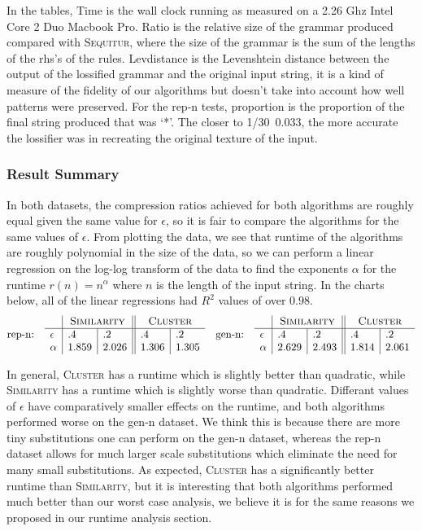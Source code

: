 \documentclass[11pt]{article}
\newcommand{\Sequitur}{\textsc{Sequitur}\xspace}
\newcommand{\Similarity}{\textsc{Similarity}\xspace}
\newcommand{\Cluster}{\textsc{Cluster}\xspace}
\begin{document}
In the tables, Time is the wall clock running as measured on a 2.26 Ghz Intel
Core 2 Duo Macbook Pro.  Ratio is the relative size of the grammar produced
compared with \Sequitur, where the size of the grammar is the sum of the
lengths of the rhs's of the rules. Levdistance is the Levenshtein distance
between the output of the lossified grammar and the original input string, it
is a kind of measure of the fidelity of our algorithms but doesn't take into
account how well patterns were preserved. For the rep-n tests, proportion is
the proportion of the final string produced that was `*'. The closer to
1/30~0.033, the more accurate the lossifier was in recreating the original
texture of the input.

\subsubsection{Result Summary}

In both datasets, the compression ratios achieved for both algorithms are
roughly equal given the same value for $\epsilon$, so it is fair to compare the
algorithms for the same values of $\epsilon$.  From plotting the data, we see
that runtime of the algorithms are roughly polynomial in the size of the data,
so we can perform a linear regression on the log-log transform of the data to
find the exponents $\alpha$ for the runtime $r(n)=n^\alpha$ where $n$ is the
length of the input string. In the charts below, all of the linear regressions
had $R^2$ values of over $0.98$.
\begin{align*}
  \text{rep-n:}\quad
  \begin{array}{l|l|l||l|l}
    & \multicolumn{2}{c||}{\Similarity} & \multicolumn{2}{c}{\Cluster} \\ \hline
    \epsilon & .4 & .2 & .4 & .2 \\
    \alpha   & 1.859 & 2.026 & 1.306 & 1.305
  \end{array}
  &&
  \text{gen-n:}\quad
  \begin{array}{l|l|l||l|l}
    & \multicolumn{2}{c||}{\Similarity} & \multicolumn{2}{c}{\Cluster} \\ \hline
    \epsilon & .4 & .2 & .4 & .2 \\
    \alpha   & 2.629 & 2.493 & 1.814 & 2.061
  \end{array}
\end{align*}

In general, \Cluster has a runtime which is slightly better than quadratic,
while \Similarity has a runtime which is slightly worse than quadratic.
Differant values of $\epsilon$ have comparatively smaller effects on the
runtime, and both algorithms performed worse on the gen-n dataset. We think
this is because there are more tiny substitutions one can perform on
the gen-n dataset, whereas the rep-n dataset allows for much larger scale
substitutions which eliminate the need for many small substitutions.
As expected, \Cluster has a significantly better runtime than \Similarity,
but it is interesting that both algorithms performed much better than our
worst case analysis, we believe it is for the same reasons we proposed
in our runtime analysis section.
\end{document}

